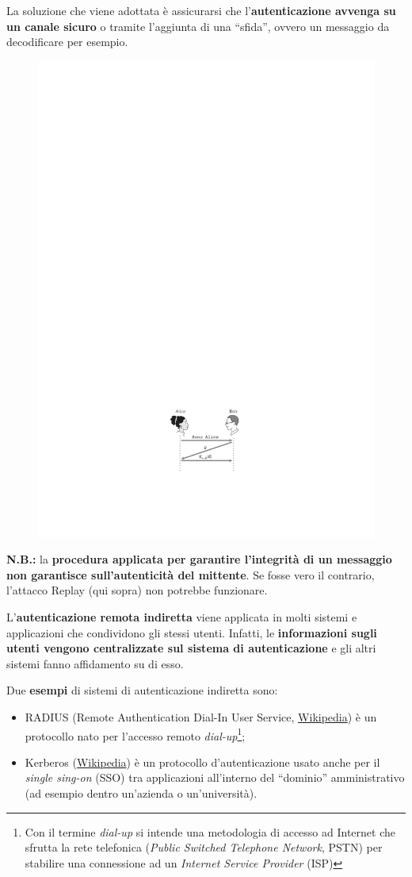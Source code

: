 \documentclass[a4paper]{article}
\newcommand{\dquotes}[1]{``#1''}
\begin{document}
	\noindent
	La soluzione che viene adottata è assicurarsi che l'\textbf{autenticazione avvenga su un canale sicuro} o tramite l'aggiunta di una \dquotes{sfida}, ovvero un messaggio da decodificare per esempio.
	\begin{figure}[!htp]
		\centering
		\includegraphics[width=.4\textwidth]{img/int-aut_e_autor/aut-remota_diretta-eg.pdf}
	\end{figure}
	
	\noindent
	\textbf{N.B.:} la \textbf{procedura applicata per garantire l'integrità di un messaggio non garantisce sull'autenticità del mittente}. Se fosse vero il contrario, l'attacco Replay (qui sopra) non potrebbe funzionare.\newpage
	
	\noindent
	L'\textcolor{Red3}{\textbf{autenticazione remota indiretta}} viene applicata in molti sistemi e applicazioni che condividono gli stessi utenti. Infatti, le \textbf{informazioni sugli utenti vengono centralizzate sul sistema di autenticazione} e gli altri sistemi fanno affidamento su di esso.\newline
	
	\noindent
	Due \textcolor{Green4}{\textbf{esempi}} di sistemi di autenticazione indiretta sono:
	\begin{itemize}
		\item RADIUS (Remote Authentication Dial-In User Service, \href{https://en.wikipedia.org/wiki/RADIUS}{Wikipedia}) è un protocollo nato per l'accesso remoto \emph{dial-up}\footnote{Con il termine \emph{dial-up} si intende una metodologia di accesso ad Internet che sfrutta la rete telefonica (\emph{Public Switched Telephone Network}, PSTN) per stabilire una connessione ad un \emph{Internet Service Provider} (ISP)};
		
		\item Kerberos (\href{https://en.wikipedia.org/wiki/Kerberos_(protocol)}{Wikipedia}) è un protocollo d'autenticazione usato anche per il \emph{single sing-on} (SSO) tra applicazioni all'interno del \dquotes{dominio} amministrativo (ad esempio dentro un'azienda o un'università).
	\end{itemize}
	
\end{document}
